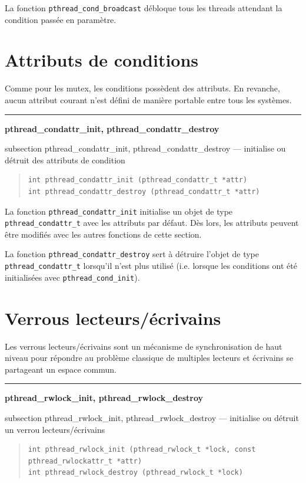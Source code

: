 \documentclass [twoside] {report}
\newcommand {\primitive} [1]
    {
	\phantomsection
	{\large \textbf {#1}}
	\addcontentsline {toc} {subsection} {#1}
    }
\newcommand {\separation}
    {
	\vspace {5mm}
	\nopagebreak
	\hrule
    }
\begin{document}
La fonction \verb|pthread_cond_broadcast| débloque tous les threads
attendant la condition passée en paramètre.


\section {Attributs de conditions}

Comme pour les mutex, les conditions possèdent des attributs. En
revanche, aucun attribut courant n'est défini de manière portable
entre tous les systèmes.


\separation
\primitive {pthread\_condattr\_init, pthread\_condattr\_destroy} --- initialise ou détruit des attributs de condition

\begin {quote}
\begin {verbatim}
int pthread_condattr_init (pthread_condattr_t *attr)
int pthread_condattr_destroy (pthread_condattr_t *attr)
\end{verbatim}
\end {quote}

La fonction \verb|pthread_condattr_init| initialise un objet de type
\verb|pthread_condattr_t| avec les attributs par défaut. Dès lors,
les attributs peuvent être modifiés avec les autres fonctions de
cette section.

La fonction \verb|pthread_condattr_destroy| sert à détruire
l'objet de type \verb|pthread_condattr_t| lorsqu'il n'est plus
utilisé (i.e.  lorsque les conditions ont été initialisées avec
\verb|pthread_cond_init|).


\section {Verrous lecteurs/écrivains}

Les verrous lecteurs/écrivains sont un mécanisme de synchronisation de
haut niveau pour répondre au problème classique de multiples lecteurs
et écrivains se partageant un espace commun.

\separation
\primitive {pthread\_rwlock\_init, pthread\_rwlock\_destroy} --- initialise ou détruit un verrou lecteurs/écrivains

\begin {quote}
\begin {verbatim}
int pthread_rwlock_init (pthread_rwlock_t *lock, const pthread_rwlockattr_t *attr)
int pthread_rwlock_destroy (pthread_rwlock_t *lock)
\end{verbatim}
\end {quote}
\end{document}
